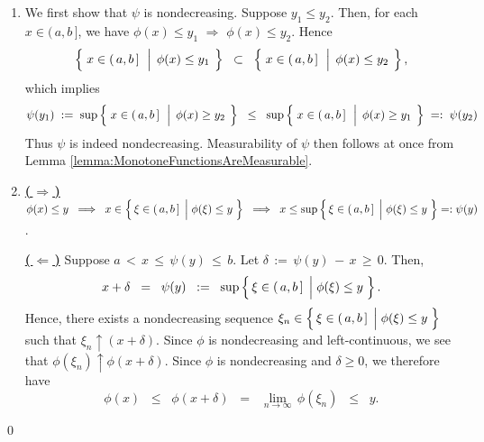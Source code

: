\begin{enumerate}
\item
	We first show that $\psi$ is nondecreasing.
	Suppose $y_{1} \leq y_{2}$. Then, for each $x \in (\,a,b\,]$, we have
	$\phi(x) \leq y_{1}$ $\Longrightarrow$ $\phi(x) \leq y_{2}$.
	Hence
	\begin{equation*}
	\left\{\;
		x \in (\,a,b\,]
		\,\;\left\vert\;\,
			\overset{{\color{white}.}}{\phi}(x) \leq y_{1}
		\right.
		\;\right\}
	\;\; \subset \;\;
	\left\{\;
		x \in (\,a,b\,]
		\,\;\left\vert\;\,
			\overset{{\color{white}.}}{\phi}(x) \leq y_{2}
		\right.
		\;\right\},
	\end{equation*}
	which implies
	\begin{equation*}
	\psi(y_{1}) \; := \;
	\sup\left\{\;
		x \in (\,a,b\,]
		\,\;\left\vert\;\,
			\overset{{\color{white}.}}{\phi}(x) \geq y_{2}
		\right.
		\;\right\}
	\;\; \leq \;\;
	\sup\left\{\;
		x \in (\,a,b\,]
		\,\;\left\vert\;\,
			\overset{{\color{white}.}}{\phi}(x) \geq y_{1}
		\right.
		\;\right\}
	\; =: \; \psi(y_{2})
	\end{equation*}
	Thus $\psi$ is indeed nondecreasing.
	Measurability of $\psi$ then follows at once from Lemma \ref{lemma:MonotoneFunctionsAreMeasurable}.
\item
	\textbf{\underline{(\,$\Longrightarrow$\,)}}\quad
	$\phi(x) \leq y
	\;\;\Longrightarrow\;\;
		x \in \left\{\,\xi\in(\,a,b\,] \;\left\vert\; \phi(\xi) \overset{{\color{white}.}}{\leq} y\right.\,\right\}
	\;\; \Longrightarrow \;\;
		x \leq \sup\left\{\,\xi\in(\,a,b\,] \;\left\vert\; \phi(\xi) \overset{{\color{white}.}}{\leq} y\right.\,\right\} =: \psi(y)$.

	\vskip 0.2cm
	\noindent
	\textbf{\underline{(\,$\Longleftarrow$\,)}}\quad
	Suppose \;$a \,<\, x \,\leq\, \psi(y) \,\leq\, b$.\;
	Let \;$\delta \,:=\, \psi(y) \,-\, x \,\geq\, 0$. Then,
	\begin{equation*}
	x + \delta \;\;=\;\; \psi(y) \;\;:=\;\; \sup\left\{\,\xi\in(\,a,b\,] \;\left\vert\; \phi(\xi) \overset{{\color{white}.}}{\leq} y\right.\,\right\}.
	\end{equation*}
	Hence, there exists a nondecreasing sequence
	$\xi_{n} \in \left\{\,\xi\in(\,a,b\,] \;\left\vert\; \phi(\xi) \overset{{\color{white}.}}{\leq} y\right.\,\right\}$
	such that $\xi_{n} \uparrow (x+\delta)$.
	Since $\phi$ is {\color{red}nondecreasing and left-continuous}, we see that $\phi(\xi_{n}) \uparrow \phi(x+\delta)$.
	Since $\phi$ is nondecreasing and $\delta \geq 0$, we therefore have
	\begin{equation*}
	\phi(x) \;\;\leq\;\; \phi(x+\delta) \;\;=\;\; \underset{n\rightarrow\infty}{\lim}\,\phi(\xi_{n}) \;\;\leq\;\; y.
	\end{equation*}
\end{enumerate}
\qed

